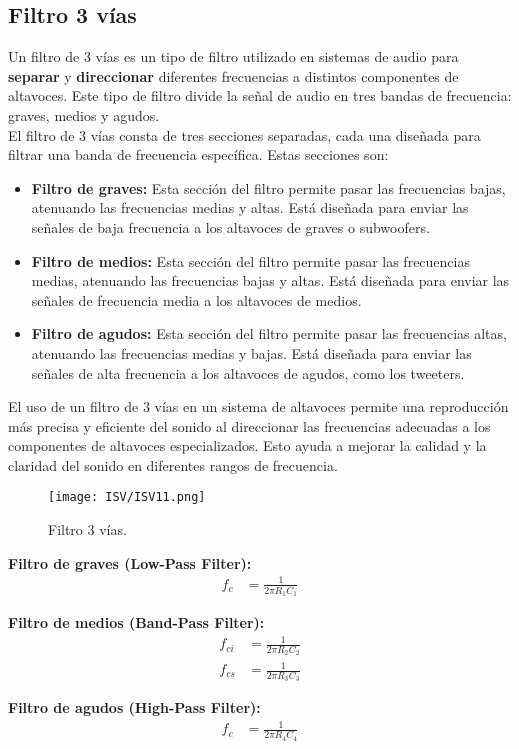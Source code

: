 \documentclass[
	12pt, %
	fleqn, %
	a4paper, %
	oneside, %
]{LegrandOrangeBook}
\begin{document}
\subsection{Filtro 3 vías}
Un filtro de 3 vías es un tipo de filtro utilizado en sistemas de audio para \textbf{separar} y \textbf{direccionar} diferentes frecuencias a distintos componentes de altavoces. Este tipo de filtro divide la señal de audio en tres bandas de frecuencia: graves, medios y agudos.\\
El filtro de 3 vías consta de tres secciones separadas, cada una diseñada para filtrar una banda de frecuencia específica. Estas secciones son:
\begin{itemize}
\item \textbf{Filtro de graves:} Esta sección del filtro permite pasar las frecuencias bajas, atenuando las frecuencias medias y altas. Está diseñada para enviar las señales de baja frecuencia a los altavoces de graves o subwoofers.
\item \textbf{Filtro de medios:} Esta sección del filtro permite pasar las frecuencias medias, atenuando las frecuencias bajas y altas. Está diseñada para enviar las señales de frecuencia media a los altavoces de medios.
\item \textbf{Filtro de agudos:} Esta sección del filtro permite pasar las frecuencias altas, atenuando las frecuencias medias y bajas. Está diseñada para enviar las señales de alta frecuencia a los altavoces de agudos, como los tweeters.
\end{itemize}
El uso de un filtro de 3 vías en un sistema de altavoces permite una reproducción más precisa y eficiente del sonido al direccionar las frecuencias adecuadas a los componentes de altavoces especializados. Esto ayuda a mejorar la calidad y la claridad del sonido en diferentes rangos de frecuencia.
\begin{figure}[H]
\centering
\texttt{[image: ISV/ISV11.png]}
\caption{Filtro 3 vías.}
\end{figure}
\textbf{Filtro de graves (Low-Pass Filter):}
\begin{align*}
f_c &= \frac{1}{2\pi R_1C_1}
\end{align*}

\textbf{Filtro de medios (Band-Pass Filter):}
\begin{align*}
f_{ci} &= \frac{1}{2\pi R_2C_2} \\
f_{cs} &= \frac{1}{2\pi R_3C_3}
\end{align*}

\textbf{Filtro de agudos (High-Pass Filter):}
\begin{align*}
f_c &= \frac{1}{2\pi R_4C_4}
\end{align*}
\end{document}
